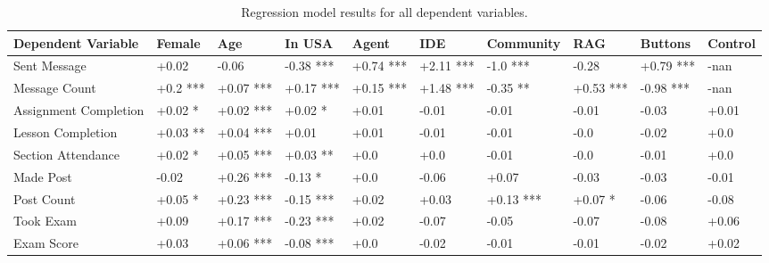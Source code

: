 \begin{table*}[t]
\begin{center}
\begin{tabularx}{\textwidth}{lXXXXXXXXX}
\toprule
Dependent Variable & Female & Age & In USA & Agent & IDE & Community & RAG & Buttons & Control \\
\midrule
Sent Message & +0.02 & -0.06 & -0.38 *** & +0.74 *** & +2.11 *** & -1.0 *** & -0.28 & +0.79 *** & -nan \\
Message Count & +0.2 *** & +0.07 *** & +0.17 *** & +0.15 *** & +1.48 *** & -0.35 ** & +0.53 *** & -0.98 *** & -nan \\
Assignment Completion & +0.02 * & +0.02 *** & +0.02 * & +0.01 & -0.01 & -0.01 & -0.01 & -0.03 & +0.01 \\
Lesson Completion & +0.03 ** & +0.04 *** & +0.01 & +0.01 & -0.01 & -0.01 & -0.0 & -0.02 & +0.0 \\
Section Attendance & +0.02 * & +0.05 *** & +0.03 ** & +0.0 & +0.0 & -0.01 & -0.0 & -0.01 & +0.0 \\
Made Post & -0.02 & +0.26 *** & -0.13 * & +0.0 & -0.06 & +0.07 & -0.03 & -0.03 & -0.01 \\
Post Count & +0.05 * & +0.23 *** & -0.15 *** & +0.02 & +0.03 & +0.13 *** & +0.07 * & -0.06 & -0.08 \\
Took Exam & +0.09 & +0.17 *** & -0.23 *** & +0.02 & -0.07 & -0.05 & -0.07 & -0.08 & +0.06 \\
Exam Score & +0.03 & +0.06 *** & -0.08 *** & +0.0 & -0.02 & -0.01 & -0.01 & -0.02 & +0.02 \\
\bottomrule
\end{tabularx}
\end{center}
\caption{Regression model results for all dependent variables.}
\label{tab:regression_results}
\end{table*}
